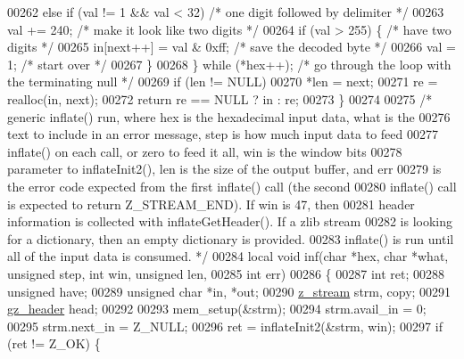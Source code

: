 \begin{DoxyCode}
{{{{{00262         \textcolor{keywordflow}{else} \textcolor{keywordflow}{if} (val != 1 && val < 32)  \textcolor{comment}{/* one digit followed by delimiter */}
00263             val += 240;                 \textcolor{comment}{/* make it look like two digits */}
00264         \textcolor{keywordflow}{if} (val > 255) \{                \textcolor{comment}{/* have two digits */}
00265             in[next++] = val & 0xff;    \textcolor{comment}{/* save the decoded byte */}
00266             val = 1;                    \textcolor{comment}{/* start over */}
00267         \}
00268     \} \textcolor{keywordflow}{while} (*hex++);       \textcolor{comment}{/* go through the loop with the terminating null */}
00269     \textcolor{keywordflow}{if} (len != NULL)
00270         *len = next;
00271     re = realloc(in, next);
00272     \textcolor{keywordflow}{return} re == NULL ? in : re;
00273 \}
00274 
00275 \textcolor{comment}{/* generic inflate() run, where hex is the hexadecimal input data, what is the}
00276 \textcolor{comment}{   text to include in an error message, step is how much input data to feed}
00277 \textcolor{comment}{   inflate() on each call, or zero to feed it all, win is the window bits}
00278 \textcolor{comment}{   parameter to inflateInit2(), len is the size of the output buffer, and err}
00279 \textcolor{comment}{   is the error code expected from the first inflate() call (the second}
00280 \textcolor{comment}{   inflate() call is expected to return Z\_STREAM\_END).  If win is 47, then}
00281 \textcolor{comment}{   header information is collected with inflateGetHeader().  If a zlib stream}
00282 \textcolor{comment}{   is looking for a dictionary, then an empty dictionary is provided.}
00283 \textcolor{comment}{   inflate() is run until all of the input data is consumed. */}
00284 local \textcolor{keywordtype}{void} inf(\textcolor{keywordtype}{char} *hex, \textcolor{keywordtype}{char} *what, \textcolor{keywordtype}{unsigned} step, \textcolor{keywordtype}{int} win, \textcolor{keywordtype}{unsigned} len,
00285                \textcolor{keywordtype}{int} err)
00286 \{
00287     \textcolor{keywordtype}{int} ret;
00288     \textcolor{keywordtype}{unsigned} have;
00289     \textcolor{keywordtype}{unsigned} \textcolor{keywordtype}{char} *in, *out;
00290     \hyperlink{structz__stream__s}{z\_stream} strm, copy;
00291     \hyperlink{structgz__header__s}{gz\_header} head;
00292 
00293     mem\_setup(&strm);
00294     strm.avail\_in = 0;
00295     strm.next\_in = Z\_NULL;
00296     ret = inflateInit2(&strm, win);
00297     \textcolor{keywordflow}{if} (ret != Z\_OK) \{
}}}}}
\end{DoxyCode}

